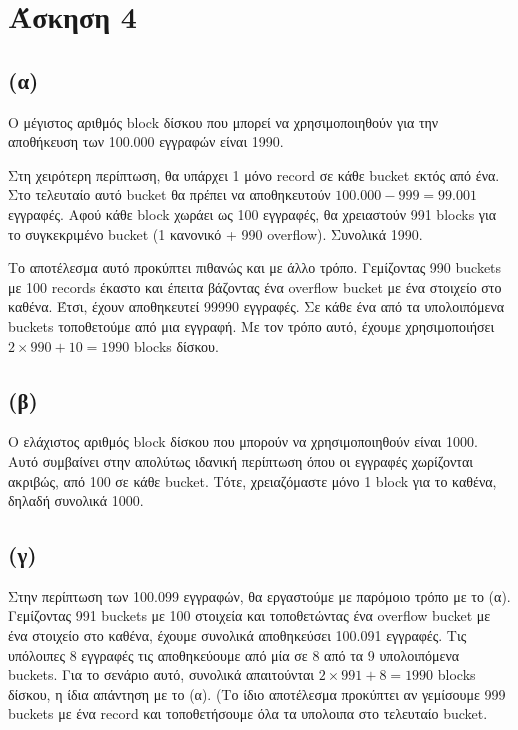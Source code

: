 \documentclass[a4paper,11pt]{article}
\begin{document}

\section{Άσκηση 4}

\subsection*{(α)}
Ο μέγιστος αριθμός block δίσκου που μπορεί να χρησιμοποιηθούν για την
αποθήκευση των 100.000 εγγραφών είναι 1990.

Στη χειρότερη περίπτωση, θα υπάρχει 1 μόνο record σε κάθε bucket εκτός από
ένα. Στο τελευταίο αυτό bucket θα πρέπει να αποθηκευτούν $100.000 - 999 =
99.001$ εγγραφές. Αφού κάθε block χωράει ως 100 εγγραφές, θα χρειαστούν 991
blocks για το συγκεκριμένο bucket (1 κανονικό + 990 overflow). Συνολικά 1990.

Το αποτέλεσμα αυτό προκύπτει πιθανώς και με άλλο τρόπο. Γεμίζοντας 990 buckets
με 100 records έκαστο και έπειτα βάζοντας ένα overflow bucket με ένα στοιχείο
στο καθένα. Έτσι, έχουν αποθηκευτεί 99990 εγγραφές. Σε κάθε ένα από τα
υπολοιπόμενα buckets τοποθετούμε από μια εγγραφή. Με τον τρόπο αυτό, έχουμε
χρησιμοποιήσει $2\times 990 + 10 = 1990$ blocks δίσκου.

\subsection*{(β)}
Ο ελάχιστος αριθμός block δίσκου που μπορούν να χρησιμοποιηθούν είναι 1000.
Αυτό συμβαίνει στην απολύτως ιδανική περίπτωση όπου οι εγγραφές χωρίζονται
ακριβώς, από 100 σε κάθε bucket. Τότε, χρειαζόμαστε μόνο 1 block για το
καθένα, δηλαδή συνολικά 1000.

\subsection*{(γ)}
Στην περίπτωση των 100.099 εγγραφών, θα εργαστούμε με παρόμοιο τρόπο με το
(α). Γεμίζοντας 991 buckets με 100 στοιχεία και τοποθετώντας ένα overflow
bucket με ένα στοιχείο στο καθένα, έχουμε συνολικά αποθηκεύσει 100.091
εγγραφές. Τις υπόλοιπες 8 εγγραφές τις αποθηκεύουμε από μία σε 8 από τα 9
υπολοιπόμενα buckets. Για το σενάριο αυτό, συνολικά απαιτούνται $2\times 991 +
8 = 1990$ blocks δίσκου, η ίδια απάντηση με το (α). (Το ίδιο αποτέλεσμα
προκύπτει αν γεμίσουμε 999 buckets με ένα record και τοποθετήσουμε όλα τα
υπολοιπα στο τελευταίο bucket.
\end{document}

